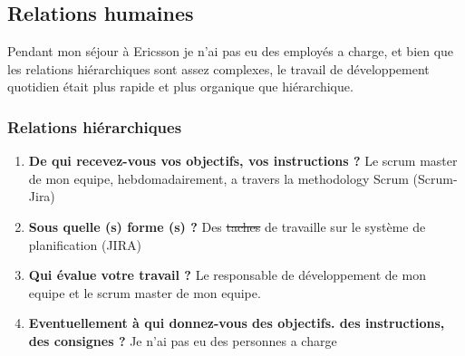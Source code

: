 \documentclass{resume} %
\providecommand{\DIFaddtex}[1]{{\protect\color{blue}\uwave{#1}}} %
\providecommand{\DIFdeltex}[1]{{\protect\color{red}\sout{#1}}}                      %
\providecommand{\DIFaddbegin}{} %
\providecommand{\DIFaddend}{} %
\providecommand{\DIFdelbegin}{} %
\providecommand{\DIFdelend}{} %
\providecommand{\DIFadd}[1]{\texorpdfstring{\DIFaddtex{#1}}{#1}} %
\providecommand{\DIFdel}[1]{\texorpdfstring{\DIFdeltex{#1}}{}} %
\begin{document}
\subsection{Relations humaines}

	
	Pendant mon séjour à Ericsson je n'ai pas eu des employés a charge, et bien que les relations hiérarchiques sont assez complexes, le travail de développement quotidien était plus rapide et plus organique que hiérarchique.

	\subsubsection {Relations hiérarchiques}
		 \begin{enumerate} 
		\item \textbf{De qui recevez-vous vos objectifs, vos instructions ?}
			Le scrum master de mon equipe, hebdomadairement, a travers la methodology Scrum (Scrum-Jira)
		\item \textbf{Sous quelle (s) forme (s) ?}
			Des \DIFdelbegin \DIFdel{taches }\DIFdelend \DIFaddbegin \DIFadd{tâches }\DIFaddend de travaille sur le système de planification (JIRA) 
		\item \textbf{Qui évalue votre travail ?}
			Le responsable de développement de mon equipe et le scrum master de mon equipe.
		\item  \textbf{Eventuellement à qui donnez-vous des objectifs. des instructions, des consignes ?}
			Je n'ai pas eu des personnes a charge 
		 \end{enumerate} 
\end{document}

